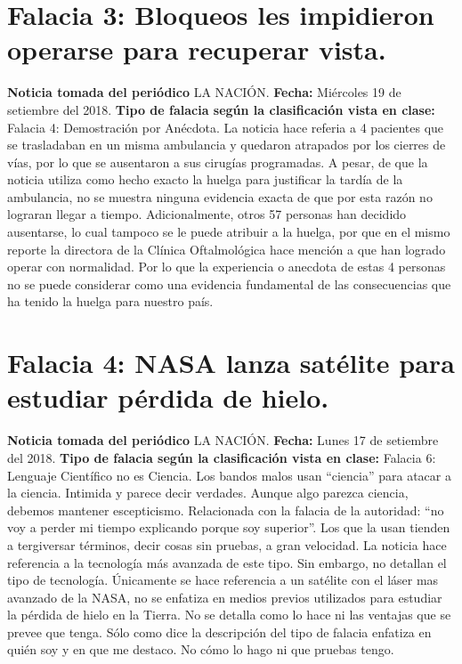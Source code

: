 \documentclass[11pt,a4paper,titlepage]{article}
\newcommand{\quotes}[1]{``#1''}
\begin{document}
{{\section{Falacia 3: Bloqueos les impidieron operarse para recuperar vista. }{%
\textbf{Noticia tomada del periódico} LA NACIÓN.
\newline
\textbf{Fecha:} Miércoles 19 de setiembre del 2018.
\newline
\textbf{Tipo de falacia según la clasificación vista en clase:} 
\newline
Falacia 4: Demostraci\'on por An\'ecdota.
\newline
\newline
La noticia hace referia a 4 pacientes que se trasladaban en un misma ambulancia y quedaron atrapados por los cierres de v\'ias, por lo que se ausentaron a sus cirug\'ias programadas. A pesar, de que la noticia utiliza como hecho exacto la huelga para justificar la tard\'ia de la ambulancia, no se muestra ninguna evidencia exacta de que por esta raz\'on no lograran llegar a tiempo.
\newline
Adicionalmente, otros 57 personas han decidido ausentarse, lo cual tampoco se le puede atribuir a la huelga, por que en el mismo reporte la directora de la Cl\'inica Oftalmol\'ogica hace menci\'on a que han logrado operar con normalidad.
\newline
Por lo que la experiencia o anecdota de estas 4 personas no se puede considerar como una evidencia fundamental de las consecuencias que ha tenido la huelga para nuestro pa\'is.

\section{Falacia 4: NASA lanza sat\'elite para estudiar p\'erdida de hielo. }{%
\textbf{Noticia tomada del periódico} LA NACIÓN.
\newline
\textbf{Fecha:} Lunes 17 de setiembre del 2018.
\newline
\textbf{Tipo de falacia según la clasificación vista en clase:} 
\newline
Falacia 6: Lenguaje Cient\'ifico no es Ciencia.
\newline
\newline
Los bandos malos usan \quotes{ciencia} para atacar a la ciencia. Intimida y parece
decir verdades. Aunque algo parezca ciencia, debemos mantener escepticismo.
Relacionada con la falacia de la autoridad:  \quotes{no voy a perder mi tiempo explicando porque soy superior}. Los que la usan tienden a tergiversar t\'erminos, decir cosas sin pruebas, a gran velocidad.
\newline
La noticia hace referencia a la tecnolog\'ia m\'as avanzada de este tipo. Sin embargo, no detallan el tipo de tecnolog\'ia. \'Unicamente se hace referencia a un sat\'elite con el l\'aser mas avanzado de la NASA, no se enfatiza en medios previos utilizados para estudiar la p\'erdida de hielo en la Tierra. No se detalla como lo hace ni las ventajas que se prevee que tenga. S\'olo como dice la descripci\'on del tipo de falacia enfatiza en qui\'en soy y en que me destaco. No c\'omo lo hago ni que pruebas tengo.

}}}}
\end{document}
